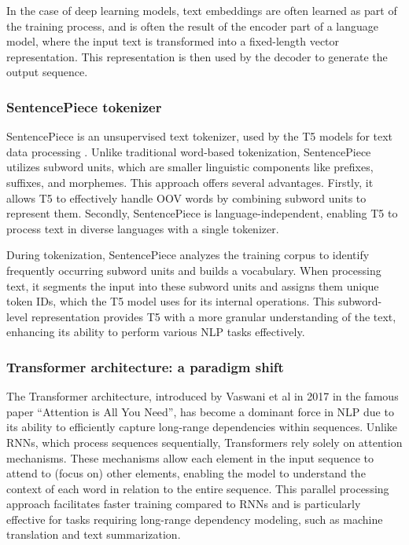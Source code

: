 \documentclass[12pt]{article}
\begin{document}
In the case of deep learning models, text embeddings are often learned as part of the training process, and is often the result of the encoder part of a language model, where the input text is transformed into a fixed-length vector representation. This representation is then used by the decoder to generate the output sequence.

\subsubsection{SentencePiece tokenizer}

SentencePiece is an unsupervised text tokenizer, used by the T5 models for text data processing \cite{Kudo2018}. Unlike traditional word-based tokenization, SentencePiece utilizes subword units, which are smaller linguistic components like prefixes, suffixes, and morphemes. This approach offers several advantages. Firstly, it allows T5 to effectively handle OOV words by combining subword units to represent them. Secondly, SentencePiece is language-independent, enabling T5 to process text in diverse languages with a single tokenizer.

During tokenization, SentencePiece analyzes the training corpus to identify frequently occurring subword units and builds a vocabulary. When processing text, it segments the input into these subword units and assigns them unique token IDs, which the T5 model uses for its internal operations. This subword-level representation provides T5 with a more granular understanding of the text, enhancing its ability to perform various NLP tasks effectively.

\subsubsection{Transformer architecture: a paradigm shift}

The Transformer architecture, introduced by Vaswani et al \cite{Vaswani2017} in 2017 in the famous paper “Attention is All You Need”, has become a dominant force in NLP due to its ability to efficiently capture long-range dependencies within sequences. Unlike RNNs, which process sequences sequentially, Transformers rely solely on attention mechanisms. These mechanisms allow each element in the input sequence to attend to (focus on) other elements, enabling the model to understand the context of each word in relation to the entire sequence. This parallel processing approach facilitates faster training compared to RNNs and is particularly effective for tasks requiring long-range dependency modeling, such as machine translation and text summarization.
\end{document}
